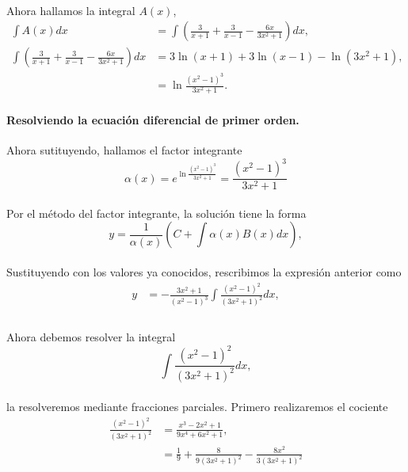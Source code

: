 \documentclass{article}
\begin{document}
\paragraph{} Ahora hallamos la integral $A(x)$,
\begin{align*}
\int A(x) dx &= \int \left(\frac{3}{x+1} + \frac{3}{x-1} - \frac{6x}{3x^2 + 1}\right)dx,\\
\int \left(\frac{3}{x+1} + \frac{3}{x-1} - \frac{6x}{3x^2 + 1}\right)dx &= 3\ln{(x+1)} + 3\ln{(x-1)} - \ln{(3x^2 + 1)},\\
&=  \ln{\frac{(x^2-1)^3}{3x^2 + 1}}.
\end{align*}
\paragraph{Resolviendo la ecuación diferencial de primer orden.} Ahora sutituyendo, hallamos el factor integrante
$$\alpha(x) = e^{\ln{\frac{(x^2-1)^3}{3x^2 + 1}}} = \frac{(x^2-1)^3}{3x^2 + 1}$$
\paragraph{}Por el método del factor integrante, la solución tiene la forma
$$y = \frac{1}{\alpha(x)}\left(C + \int \alpha(x)B(x)dx\right),$$
\paragraph{}Sustituyendo con los valores ya conocidos, rescribimos la expresión anterior como
\begin{align*}
y &= -\frac{3x^2 + 1}{(x^2-1)^3} \int \frac{(x^2 - 1)^2}{(3x^2+1)^2}dx,\\
\end{align*}
\paragraph{} Ahora debemos resolver la integral
$$\int \frac{(x^2 - 1)^2}{(3x^2 + 1)^2} dx,$$
\paragraph{}la resolveremos mediante fracciones parciales. Primero realizaremos el cociente
\begin{align*}
\frac{(x^2 - 1)^2}{(3x^2 + 1)^2} &= \frac{x^3 - 2x^2 + 1}{9x^4 + 6x^2 +1},\\
&= \frac{1}{9} + \frac{8}{9(3x^2 + 1)^2} - \frac{8x^2}{3(3x^2 + 1)^2}
\end{align*}
\end{document}
